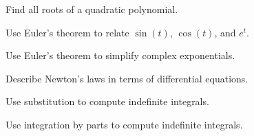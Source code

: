 \begin{readinessAssuranceOutcomes}
\item Find all roots of a quadratic polynomial. 
\item Use Euler's theorem to relate \(\sin(t)\), \(\cos(t)\), and \(e^t\).
\item Use Euler's theorem to simplify complex exponentials.
\item Describe Newton's laws in terms of differential equations.
\item Use substitution to compute indefinite integrals.
\item Use integration by parts to compute indefinite integrals.
\end{readinessAssuranceOutcomes}
